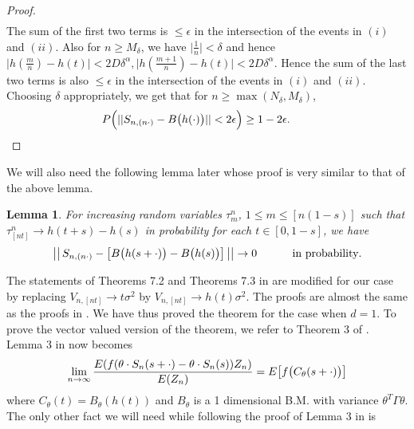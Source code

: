 \documentclass[11pt]{amsart}
\newtheorem{lemma}[theorem]{\sc Lemma}
\begin{document}
\begin{proof}
\begin{eqnarray*}
\end{eqnarray*}
The sum of the first two terms is $\leq \epsilon$ in the intersection of the events in $(i)$ and $(ii)$. Also for $n \ge M_{\delta}$, we have $\vert \frac{1}{n} \vert < \delta$ and hence \begin{math} \vert h(\frac{m}{n})-h(t) \vert < 2D \delta^{\alpha}, \vert h(\frac{m+1}{n})-h(t) \vert < 2D \delta^{\alpha}
\end{math}. Hence the sum of the last two terms is also $\le \epsilon$ in the intersection of the events in $(i)$ and $(ii)$.
Choosing $\delta$ appropriately, we get that for $n \geq \max(N_{\delta}, M_{\delta}) $,
\[ P \Big{(} \vert \vert S_{n,(n\cdot)} - B\big{(}h(\cdot)\big{)} \vert \vert < 2 \epsilon \Big{)} \geq 1- 2 \epsilon . \qquad \]
\end{proof}
\vspace{0.5cm}
We will also need the following lemma later whose proof is very similar to that of the above lemma.

\bigskip

\begin{lemma}
For increasing random variables $\tau_{m}^n$, $1 \leq m \leq [n(1-s)]$ such that $\tau_{[nt]}^n \to h(t+s) - h(s)$ in probability for each $t \in [0,1-s]$, we have
\[ \big\vert \big\vert \, S_{n,(n \cdot)} - \big{[}B\big{(}h(s+ \cdot)\big{)}- B\big{(}h(s)\big{)} \big{]} \,\big \vert \big \vert  \to 0 \hspace{1cm} \mbox{ in probability}. \]

\end{lemma}
\vspace{0.5cm}
The statements of Theorems 7.2 and Theorems 7.3 in \cite{durr} are modified for our case by replacing $V_{n,[nt]} \to t\sigma^2$ by $V_{n,[nt]} \to h(t)\sigma^2$. The proofs are almost the same as the proofs in \cite{durr}. We have thus proved the theorem for the case when $d=1$. To prove the vector valued version of the theorem, we refer to Theorem 3 of \cite{rsptrf}. Lemma 3 in \cite{rsptrf} now becomes 
\[ \lim \limits_{ n \to \infty} \frac{E(f(\theta \cdot S_n(s+ \cdot)- \theta \cdot S_n(s) ) Z_n ) }{E(Z_n)} = E\big{[}f\big{(}C_{\theta}(s+ \cdot)\big{)}\big{]} \]
where $C_{\theta}(t)= B_{\theta}(h(t))$ and $B_{\theta}$ is a 1 dimensional B.M. with variance $\theta^{T} \Gamma \theta $. The only other fact we will need while following the proof of Lemma 3 in \cite{rsptrf} is 

\bigskip
\end{document}
